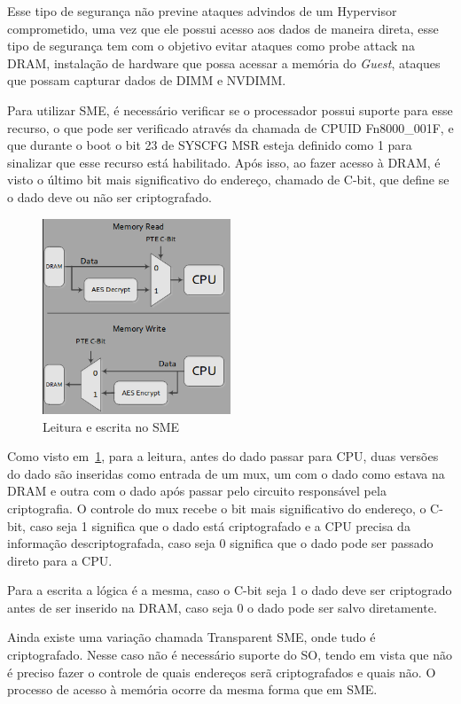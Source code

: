 \documentclass{report}
\begin{document}
Esse tipo de segurança não previne ataques advindos de um Hypervisor
comprometido, uma vez que ele possui acesso aos dados de maneira direta, esse
tipo de segurança tem com o objetivo evitar ataques como probe attack na DRAM,
instalação de hardware que possa acessar a memória do \textit{Guest}, ataques
que possam capturar dados de DIMM e NVDIMM\@.

Para utilizar SME, é necessário verificar se o processador possui suporte para
esse recurso, o que pode ser verificado através da chamada de CPUID
Fn8000\_001F, e que durante o boot o bit 23 de SYSCFG MSR esteja definido como
1 para sinalizar que esse recurso está habilitado. Após isso, ao fazer acesso à
DRAM, é visto o último bit mais significativo do endereço, chamado de C-bit,
que define se o dado deve ou não ser criptografado.

\begin{figure}[h]
    \centering
    \includegraphics[width=0.5\textwidth]{img/sme_read_write_architecture.png}
    \caption{Leitura e escrita no SME}\label{sme-read-write}
\end{figure}

Como visto em~\ref{sme-read-write}, para a leitura, antes do dado passar para
CPU, duas versões do dado são inseridas como entrada de um mux, um com o dado
como estava na DRAM e outra com o dado após passar pelo circuito responsável
pela criptografia. O controle do mux recebe o bit mais significativo do
endereço, o C-bit, caso seja 1 significa que o dado está criptografado e a CPU
precisa da informação descriptografada, caso seja 0 significa que o dado pode
ser passado direto para a CPU\@.

Para a escrita a lógica é a mesma, caso o C-bit seja 1 o dado deve ser
criptogrado antes de ser inserido na DRAM, caso seja 0 o dado pode ser salvo
diretamente.

Ainda existe uma variação chamada Transparent SME, onde tudo é criptografado.
Nesse caso não é necessário suporte do SO, tendo em vista que não é preciso
fazer o controle de quais endereços serã criptografados e quais não. O processo
de acesso à memória ocorre da mesma forma que em SME\@.
\end{document}
